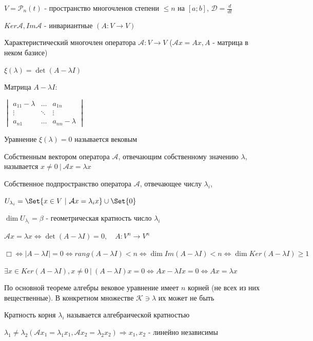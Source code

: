 \documentclass[12pt]{article}
\begin{document}
    \Ex $V = \mathcal{P}_n(t)$ - пространство многочленов степени $\leq n$ на $[a; b]$, $\mathcal{D} = \frac{d}{dt}$

    \Nota $Ker \mathcal{A}, Im \mathcal{A}$ - инвариантные $(A : V \rightarrow V)$

    \Def Характеристический многочлен оператора $\mathcal{A} : V \rightarrow V$
    ($\mathcal{A}x = Ax, A$ - матрица в неком базисе)

    $\xi(\lambda) = \det(A - \lambda I)$

    \Nota Матрица $A - \lambda I$:

    $\begin{vmatrix}a_{11} - \lambda & \dots & a_{1n} \\ \vdots & \ddots & \vdots \\ a_{n1} & \dots & a_{nn} - \lambda \end{vmatrix}$

    \Nota Уравнение $\xi(\lambda) = 0$ называется вековым

    \Def Собственным вектором оператора $\mathcal{A}$, отвечающим собственному значению $\lambda$,
    называется $x \neq 0 \ | \ \mathcal{A}x = \lambda x$

    \Def Собственное подпространство оператора $\mathcal{A}$, отвечающее числу $\lambda_i$,

    $U_{\lambda_i} = \Set{x \in V \ | \ \mathcal{A}x = \lambda_i x} \union \Set{0}$

    \Def $\dim U_{\lambda_i} = \beta$ - геометрическая кратность число $\lambda_i$

    \Th $\mathcal{A}x = \lambda x \Longleftrightarrow \det(A - \lambda I) = 0, \quad A : V^n \rightarrow V^n$

    $\Box \Longleftrightarrow |A - \lambda I| = 0 \Longleftrightarrow rang (A - \lambda I) < n \Longleftrightarrow
    \dim Im(A - \lambda I) < n \Longleftrightarrow \dim Ker(A - \lambda I) \geq 1$

    $\exists x \in Ker(A - \lambda I), x \neq 0 \ | \ (A - \lambda I) x = 0 \Longleftrightarrow Ax - \lambda I x = 0 \Longleftrightarrow Ax = \lambda x$

    \Nota По основной теореме алгебры вековое уравнение имеет $n$ корней (не всех из них вещественные).
    В конкретном множестве $\mathcal{K} \ni \lambda$ их может не быть

    \Def Кратность корня $\lambda_i$ называется алгебраической кратностью

    \Th $\lambda_1 \neq \lambda_2 (\mathcal{A}x_1 = \lambda_1 x_1, \mathcal{A}x_2 = \lambda_2 x_2) \Longrightarrow x_1, x_2$ - линейно независимы
\end{document}
